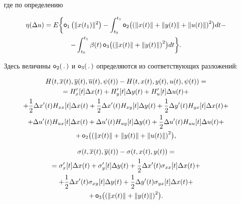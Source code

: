 где по определению 

\begin{multline}

\eta(\Delta u)=E \biggl\lbrace  \mathop{\sf o}\nolimits_{1} \left( \| x(t_{1}) \|^{2} \right)-\int^{t_{1}}_{t_{0}} \mathop{\sf o}\nolimits_{2}\bigl( \left(\| x(t) \|+ \| y(t) \|+\| u(t) \|\right) ^{2} \bigr)dt-

\\

 -\int^{t_{1}}_{t_{0}} \beta (t) \mathop{\sf o}\nolimits_{3}\bigl( \left(\| x(t) \|+ \| y(t) \| \right) ^{2} \bigr)dt \biggr\rbrace .

 \label{mast:e12}

\end{multline}

Здесь величины $ \mathop{\sf o}\nolimits_{2}(\,.\,) $  и $ \mathop{\sf o}\nolimits_{3}(\,.\,) $ определяются  из соответствующих  разложений:

\begin{multline*}

 H(t,\overline{x}(t),\overline{y}(t),\overline{u}(t),\psi (t))-H(t,x(t),y(t),u(t),\psi (t))= 

\\ 

=	  

  H'_{x}[t] \Delta x(t)+H'_{y}[t] \Delta y(t)+H'_{u}[t] \Delta u(t)+\\

 +\frac{1}{2}\Delta x'(t)H_{xx}[t] \Delta x(t)+\frac{1}{2}\Delta x'(t)H_{xy}[t] \Delta y(t)+\frac{1}{2}\Delta y'(t)H_{yx}[t] \Delta x(t)+ 

\\

+ 

  \Delta u'(t)H_{ux}[t] \Delta x(t)  +\Delta u'(t)H_{uy}[t] \Delta y(t)+\frac{1}{2}\Delta u'(t)H_{uu}[t] \Delta u(t)+ 

\\  

+  

  \mathop{\sf o}\nolimits_{2}\bigl( \left(\| x(t) \|+ \| y(t) \|+\| u(t) \|\right) ^{2} \bigr),

\end{multline*}

\begin{multline*}

\sigma (t, \overline{x}(t), \overline{y}(t))-\sigma (t,x(t),y(t)) =

\\

 =\sigma'_{x}[t] \Delta x(t)+\sigma'_{y}[t] \Delta y(t)+\frac{1}{2}\Delta x'(t)\sigma_{xx}[t] \Delta x(t)+\\

+\frac{1}{2}\Delta x'(t)\sigma_{xy}[t] \Delta y(t)+\frac{1}{2}\Delta y'(t)\sigma_{yx}[t] \Delta x(t) +

\\

 +\mathop{\sf o}\nolimits_{3}\bigl( \left(\| x(t) \|+ \| y(t) \| \right) ^{2} \bigr).

\end{multline*}



